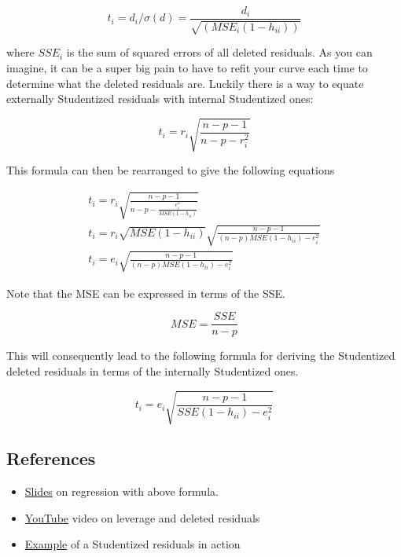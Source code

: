 \documentclass{article}
\begin{document}
\begin{equation}
t_i = d_i/\sigma(d)=\frac{d_i}{\sqrt{(MSE_i(1-h_{ii}))}}
\end{equation}

where $SSE_i$ is the sum of squared errors of all deleted residuals. As you can imagine, it can be a super big pain to have to refit your curve each time to determine what the deleted residuals are. Luckily there is a way to equate externally Studentized residuals with internal Studentized ones:

\begin{equation}
t_i = r_i \sqrt{\frac{n-p-1}{n-p-r_i^2}}
\end{equation}

This formula can then be rearranged to give the following equations

\begin{gather*}
t_i = r_i \sqrt{\frac{n-p-1}{n-p- \frac{e_i^2}{MSE(1-h_{ii})}}}\\
t_i = r_i\sqrt{MSE(1-h_{ii})} \sqrt{\frac{n-p-1}{(n-p)MSE(1-h_{ii})- e_i^2}}\\
t_i = e_i \sqrt{\frac{n-p-1}{(n-p)MSE(1-h_{ii})- e_i^2}}
\end{gather*}

Note that the MSE can be expressed in terms of the SSE. 

\begin{equation}
	MSE = \frac{SSE}{n-p}
\end{equation}

This will consequently lead to the following formula for deriving the Studentized deleted residuals in terms of the internally Studentized ones. 

\begin{equation}
	t_i = e_i \sqrt{\frac{n-p-1}{SSE(1-h_{ii})- e_i^2}}
\end{equation}

\subsection{References}
\begin{itemize}
	\item \href{https://www.stat.purdue.edu/~ghobbs/STAT\_512/Lecture\_Notes/Regression/Topic\_17.pdf}{Slides} on regression with above formula.
	\item \href{https://www.youtube.com/watch?v=ZV6OfGgroc0}{YouTube} video on leverage and deleted residuals
	\item \href{ttps://online.stat.psu.edu/stat501/lesson/11/11.4#:~:text=Studentized%20deleted%20residuals%20(or%20externally%20studentized%20residuals)&text=That%20is%2C%20a%20studentized%20deleted,standard%20deviation%20(first%20formula)}{Example} of a Studentized residuals in action		
\end{itemize}
\end{document}
